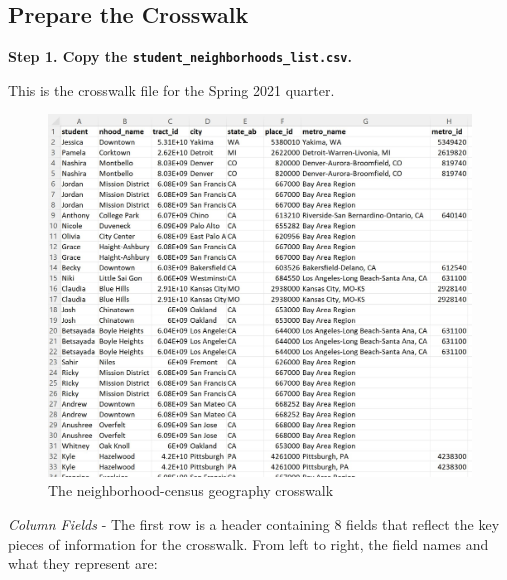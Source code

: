 \documentclass[
]{book}
\begin{document}
\hypertarget{prepare-the-crosswalk}{%
\subsection{Prepare the Crosswalk}\label{prepare-the-crosswalk}}

\textbf{Step 1. Copy the \texttt{student\_neighborhoods\_list.csv}.}

This is the crosswalk file for the Spring 2021 quarter.

\begin{figure}
\centering
\includegraphics{images/neighborhood census geog cw.jpg}
\caption{The neighborhood-census geography crosswalk}
\end{figure}

\emph{Column Fields} - The first row is a header containing 8 fields that reflect the key pieces of information for the crosswalk. From left to right, the field names and what they represent are:
\end{document}
